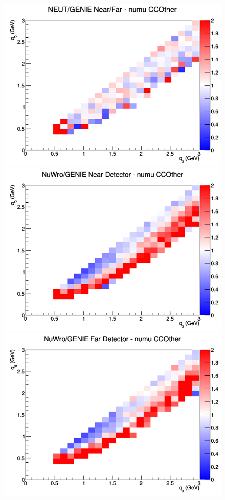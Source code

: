 \begin{figure}[h]
\endminipage
{}
\includegraphics[width=\linewidth]{q0_q3/nominal/ratios/CCOther_NEUT_GENIE_numu_NF_q3_q0.png}
\endminipage
\newline
{}
\includegraphics[width=\linewidth]{q0_q3/nominal/ratios/CCOther_NuWro_GENIE_numu_near_q3_q0.png}
\endminipage
{}
\includegraphics[width=\linewidth]{q0_q3/nominal/ratios/CCOther_NuWro_GENIE_numu_far_q3_q0.png}

\end{figure}
